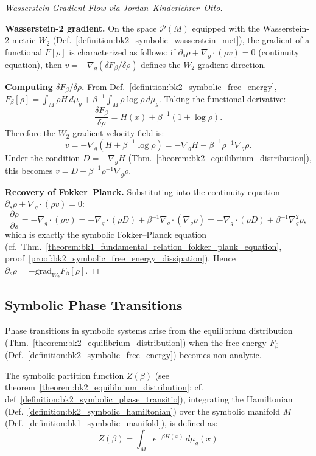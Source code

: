 \begin{proof}[Wasserstein Gradient Flow via Jordan--Kinderlehrer--Otto]
\label{proof:bk2_sketch_wasserstein_gradient_flow}
\leavevmode

\textbf{Wasserstein-2 gradient.}
On the space $\mathcal{P}(M)$ equipped with the Wasserstein-2 metric $W_2$
(Def.~\ref{definition:bk2_symbolic_wasserstein_met}), the gradient of a functional
$F[\rho]$ is characterized as follows: if $\partial_s\rho + \nabla_g\cdot(\rho v) = 0$
(continuity equation), then $v = -\nabla_g(\delta F_\beta/\delta\rho)$ defines
the $W_2$-gradient direction.

\textbf{Computing $\delta F_\beta/\delta\rho$.}
From Def.~\ref{definition:bk2_symbolic_free_energy},
$F_\beta[\rho] = \int_M \rho H\,d\mu_g + \beta^{-1}\int_M\rho\log\rho\,d\mu_g$.
Taking the functional derivative:
\[
\frac{\delta F_\beta}{\delta\rho} = H(x) + \beta^{-1}(1 + \log\rho).
\]
Therefore the $W_2$-gradient velocity field is:
\[
v = -\nabla_g\!\left(H + \beta^{-1}\log\rho\right)
  = -\nabla_g H - \beta^{-1}\rho^{-1}\nabla_g\rho.
\]
Under the condition $D = -\nabla_g H$
(Thm.~\ref{theorem:bk2_equilibrium_distribution}), this becomes
$v = D - \beta^{-1}\rho^{-1}\nabla_g\rho$.

\textbf{Recovery of Fokker--Planck.}
Substituting into the continuity equation
$\partial_s\rho + \nabla_g\cdot(\rho v) = 0$:
\[
\frac{\partial\rho}{\partial s}
= -\nabla_g\cdot(\rho v)
= -\nabla_g\cdot(\rho D) + \beta^{-1}\nabla_g\cdot(\nabla_g\rho)
= -\nabla_g\cdot(\rho D) + \beta^{-1}\nabla_g^2\rho,
\]
which is exactly the symbolic Fokker--Planck equation
(cf.~Thm.~\ref{theorem:bk1_fundamental_relation_fokker_plank_equation},
proof~\ref{proof:bk2_symbolic_free_energy_dissipation}).
Hence $\partial_s\rho = -\mathrm{grad}_{W_2}F_\beta[\rho]$.
\end{proof}

\subsection{Symbolic Phase Transitions}
\label{subsec:bk2_symbolic_phase_transitions}
Phase transitions in symbolic systems arise from the equilibrium distribution (Thm.~\ref{theorem:bk2_equilibrium_distribution}) when the free energy $F_\beta$ (Def.~\ref{definition:bk2_symbolic_free_energy}) becomes non-analytic.

\begin{definition} 
\label{definition:bk2_symbolic_partition_funct} 
The symbolic partition function $Z(\beta)$ (see theorem~\ref{theorem:bk2_equilibrium_distribution}; cf. def~\ref{definition:bk2_symbolic_phase_transitio}), integrating the Hamiltonian (Def.~\ref{definition:bk2_symbolic_hamiltonian}) over the symbolic manifold $M$ (Def.~\ref{definition:bk1_symbolic_manifold}), is defined as:
\[
Z(\beta) = \int_M e^{-\beta H(x)} \, d\mu_g(x)
\]
\end{definition}

